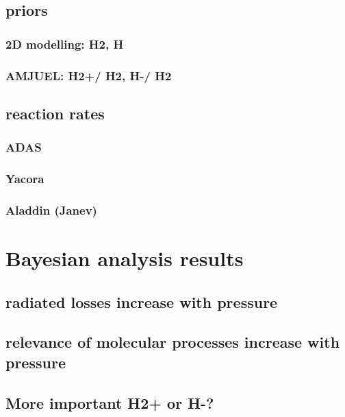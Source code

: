 \subsection{priors}
\subsubsection{2D modelling: H2, H}
\subsubsection{AMJUEL:  H2+/ H2, H-/ H2}
\subsection{reaction rates}
\subsubsection{ADAS}
\subsubsection{Yacora}
\subsubsection{Aladdin (Janev)}
\section{Bayesian analysis results}
\subsection{radiated losses increase with pressure}
\subsection{relevance of molecular processes increase with pressure}
\subsection{More important H2+ or H-?}